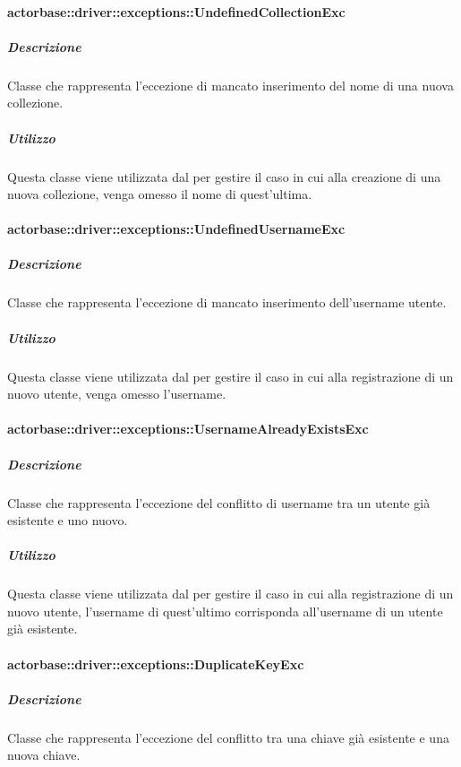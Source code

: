 \documentclass{scalatekids-article}
\begin{document}
\paragraph{actorbase::driver::exceptions::UndefinedCollectionExc}

\subparagraph{Descrizione}

Classe che rappresenta l'eccezione di mancato inserimento del nome di una nuova collezione.

\subparagraph{Utilizzo}

Questa classe viene utilizzata dal  per gestire il caso in cui alla creazione di una nuova collezione, venga omesso il nome di quest'ultima.

\paragraph{actorbase::driver::exceptions::UndefinedUsernameExc}

\subparagraph{Descrizione}

Classe che rappresenta l'eccezione di mancato inserimento dell'username utente.

\subparagraph{Utilizzo}

Questa classe viene utilizzata dal  per gestire il caso in cui alla registrazione di un nuovo utente, venga omesso l'username.

\paragraph{actorbase::driver::exceptions::UsernameAlreadyExistsExc}

\subparagraph{Descrizione}

Classe che rappresenta l'eccezione del conflitto di username tra un utente già esistente e uno nuovo.

\subparagraph{Utilizzo}

Questa classe viene utilizzata dal  per gestire il caso in cui alla registrazione di un nuovo utente, l'username di quest'ultimo corrisponda all'username di un utente già esistente.

\paragraph{actorbase::driver::exceptions::DuplicateKeyExc}

\subparagraph{Descrizione}

Classe che rappresenta l'eccezione del conflitto tra una chiave già esistente e una nuova chiave.
\end{document}
